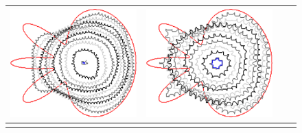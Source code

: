 \begin{figure}
\begin{tabular}{p{2.5em}ccc}
\includegraphics[scale=0.24]{figures/chapter6/radius-effect/flower/improve/len_pen0/radius-5/summary.pdf} &
\includegraphics[scale=0.24]{figures/chapter6/radius-effect/flower/improve/len_pen0/radius-9/summary.pdf} \\
\hline \\

\end{tabular}
\end{figure}
